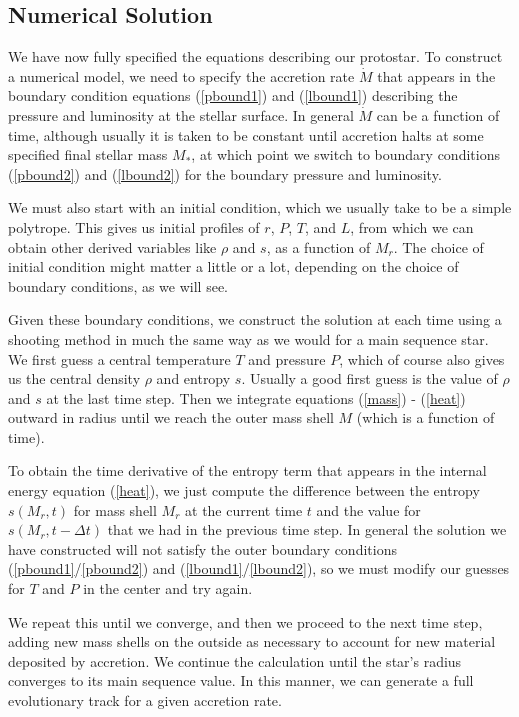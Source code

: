 \subsection{Numerical Solution}
\label{ssec:protostar_numeric}

We have now fully specified the equations describing our protostar. To construct a numerical model, we need to specify the accretion rate $\dot{M}$ that appears in the boundary condition equations (\ref{pbound1}) and (\ref{lbound1}) describing the pressure and luminosity at the stellar surface. In general $\dot{M}$ can be a function of time, although usually it is taken to be constant until accretion halts at some specified final stellar mass $M_*$, at which point we switch to boundary conditions (\ref{pbound2}) and (\ref{lbound2}) for the boundary pressure and luminosity.

We must also start with an initial condition, which we usually take to be a simple polytrope. This gives us initial profiles of $r$, $P$, $T$, and $L$, from which we can obtain other derived variables like $\rho$ and $s$, as a function of $M_r$. The choice of initial condition might matter a little or a lot, depending on the choice of boundary conditions, as we will see.

Given these boundary conditions, we construct the solution at each time using a shooting method in much the same way as we would for a main sequence star. We first guess a central temperature $T$ and pressure $P$, which of course also gives us the central density $\rho$ and entropy $s$. Usually a good first guess is the value of $\rho$ and $s$ at the last time step. Then we integrate equations (\ref{mass}) - (\ref{heat}) outward in radius until we reach the outer mass shell $M$ (which is a function of time).

To obtain the time derivative of the entropy term that appears in the internal energy equation (\ref{heat}), we just compute the difference between the entropy $s(M_r,t)$ for mass shell $M_r$ at the current time $t$ and the value for $s(M_r,t-\Delta t)$ that we had in the previous time step. In general the solution we have constructed will not satisfy the outer boundary conditions (\ref{pbound1}/\ref{pbound2}) and (\ref{lbound1}/\ref{lbound2}), so we must modify our guesses for $T$ and $P$ in the center and try again.

We repeat this until we converge, and then we proceed to the next time step, adding new mass shells on the outside as necessary to account for new material deposited by accretion. We continue the calculation until the star's radius converges to its main sequence value. In this manner, we can generate a full evolutionary track for a given accretion rate.

